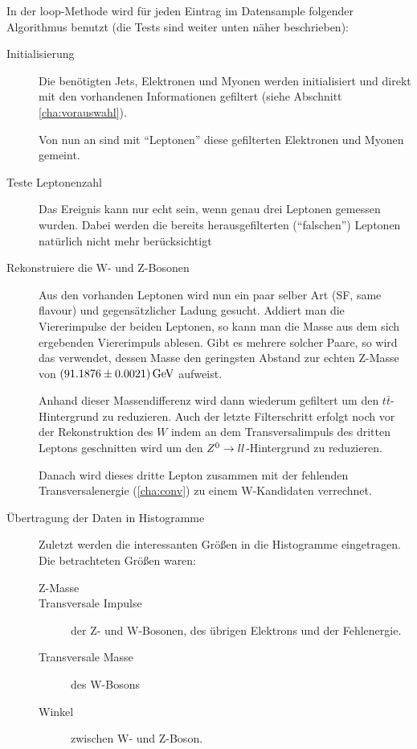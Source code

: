 In der loop-Methode wird für jeden Eintrag im Datensample folgender Algorithmus
benutzt (die Tests sind weiter unten näher beschrieben):
\begin{description}
  \item[Initialisierung] Die benötigten Jets, Elektronen und Myonen werden
    initialisiert und direkt mit den vorhandenen Informationen gefiltert (siehe
    Abschnitt \ref{cha:vorauswahl}).

    Von nun an sind mit "`Leptonen"' diese gefilterten Elektronen und Myonen
    gemeint.

  \item[Teste Leptonenzahl] Das Ereignis kann nur echt sein, wenn genau drei
    Leptonen gemessen wurden. Dabei werden die bereits herausgefilterten
    ("`falschen"') Leptonen natürlich nicht mehr berücksichtigt
    
  \item[Rekonstruiere die W- und Z-Bosonen] Aus den vorhanden Leptonen wird nun
    ein paar selber Art (SF, same flavour) und gegensätzlicher Ladung gesucht.
    Addiert man die Viererimpulse der beiden Leptonen, so kann man die Masse aus
    dem sich ergebenden Viererimpuls ablesen. Gibt es mehrere solcher Paare, so
    wird das verwendet, dessen Masse den geringsten Abstand zur echten Z-Masse
    von $\unit[(91.1876 \pm 0.0021)]{GeV}$\cite{pdg-booklet} aufweist.

    Anhand dieser Massendifferenz wird dann wiederum gefiltert um den
    $t\bar{t}$-Hintergrund zu reduzieren. Auch der letzte Filterschritt erfolgt
    noch vor der Rekonstruktion des $W$ indem an dem Transversalimpuls des
    dritten Leptons geschnitten wird um den $Z^0\to ll$-Hintergrund zu
    reduzieren.

    Danach wird dieses dritte Lepton zusammen mit der fehlenden
    Transversalenergie (\ref{cha:conv}) zu einem W-Kandidaten verrechnet.

  \item[Übertragung der Daten in Histogramme] Zuletzt werden die interessanten
    Größen in die Histogramme eingetragen. Die betrachteten Größen waren:
    \begin{description}
      \item[Z-Masse]
      \item[Transversale Impulse] der Z- und W-Bosonen, des übrigen Elektrons
        und der Fehlenergie.
      \item[Transversale Masse] des W-Bosons
      \item[Winkel] zwischen W- und Z-Boson.
    \end{description}
\end{description}

